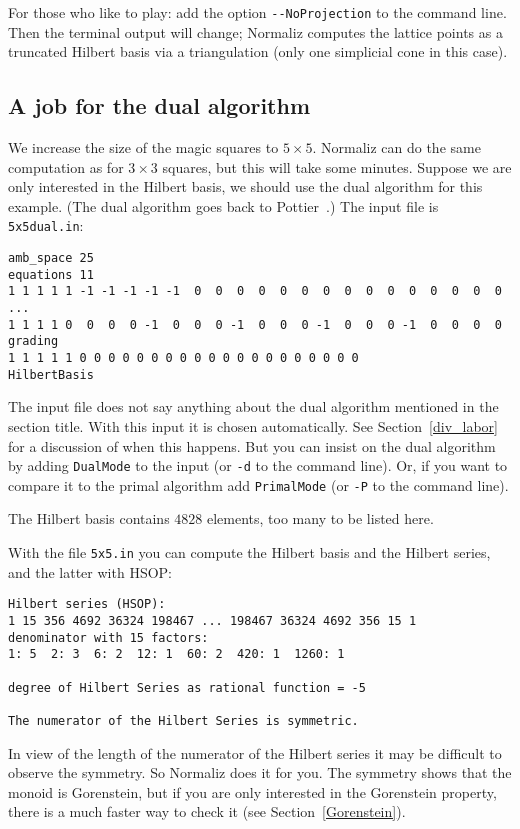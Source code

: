 \documentclass[12pt,a4paper]{scrartcl}
\theoremstyle{definition}
\def\ttt{\texttt}
\begin{document}
For those who like to play: add the option \verb|--NoProjection| to the command line. Then the terminal output will change; Normaliz computes the lattice points as a truncated Hilbert basis via a triangulation (only one simplicial cone in this case).

\subsection{A job for the dual algorithm}\label{job_dual}

We increase the size of the magic squares to $5\times 5$. Normaliz can do the same computation as for $3\times 3$ squares, but this will take some minutes. Suppose we are only interested in the Hilbert basis, we should use the dual algorithm for this example. (The dual algorithm goes back to Pottier~\cite{Po}.) The input file is \ttt{5x5dual.in}:

\begin{Verbatim}
amb_space 25
equations 11
1 1 1 1 1 -1 -1 -1 -1 -1  0  0  0  0  0  0  0  0  0  0  0  0  0  0  0
...
1 1 1 1 0  0  0  0 -1  0  0  0 -1  0  0  0 -1  0  0  0 -1  0  0  0  0
grading
1 1 1 1 1 0 0 0 0 0 0 0 0 0 0 0 0 0 0 0 0 0 0 0 0
HilbertBasis
\end{Verbatim}
The input file does not say anything about the dual algorithm mentioned in the section title. With this input it is chosen automatically. See Section~\ref{div_labor} for a discussion of when this happens. But you can insist on the dual algorithm by adding \verb|DualMode| to the input (or \verb|-d| to the command line). Or, if you want to compare it to the primal algorithm add \verb|PrimalMode| (or \verb|-P| to the command line).


The Hilbert basis contains $4828$ elements, too many to be listed here.

With the file \verb|5x5.in| you can compute the Hilbert basis and the Hilbert series, and the latter with HSOP:
\begin{Verbatim}
Hilbert series (HSOP):
1 15 356 4692 36324 198467 ... 198467 36324 4692 356 15 1 
denominator with 15 factors:
1: 5  2: 3  6: 2  12: 1  60: 2  420: 1  1260: 1  

degree of Hilbert Series as rational function = -5

The numerator of the Hilbert Series is symmetric.
\end{Verbatim}
In view of the length of the numerator of the Hilbert series it may be difficult to observe the symmetry. So Normaliz does it for you. The symmetry shows that the monoid is Gorenstein, but if you are only interested in the Gorenstein property, there is a much faster way to check it (see Section~\ref{Gorenstein}).
\end{document}
